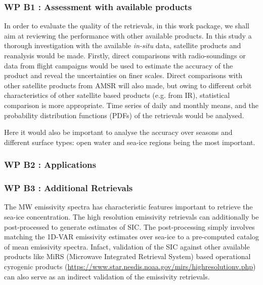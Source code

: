 \documentclass[12pt,oneside,a4paper]{article}
\begin{document}
\subsubsection*{WP B1 : Assessment with available products}

In order to evaluate the quality of the retrievals, in this work package, we shall aim at reviewing the performance with other available products. In this study a thorough investigation with the available \textit{in-situ} data, satellite products and reanalysis would be made. Firstly, direct comparisons with radio-soundings or data from flight campaigns would be used to estimate the accuracy of the product and reveal the uncertainties on finer scales.  Direct comparisons with other satellite products from AMSR \citep{gomez:2020:impro} will also made, but owing to different orbit characteristics of other satellite based products (e.g. from IR), statistical comparison is more appropriate. Time series of daily and monthly means, and the probability distribution functions (PDFs) of the retrievals would be analysed.

Here it would also be important to analyse the accuracy over seasons and different surface types: open water and sea-ice regions being the most important.

\subsubsection*{WP B2 : Applications}


\subsubsection*{WP B3 : Additional Retrievals}

The MW emissivity spectra has characteristic features important to retrieve the sea-ice concentration. The high resolution emissivity retrievals can additionally be post-processed to generate estimates of SIC. The post-processing simply involves matching the 1D-VAR emissivity estimates over sea-ice to a pre-computed catalog of mean emissivity spectra. Infact, validation of the SIC against other available products like MiRS (Microwave Integrated Retrieval System) based operational cyrogenic products (\url{https://www.star.nesdis.noaa.gov/mirs/highresolutionv.php}) can also serve as an indirect validation of the emissivity retrievals.

\end{document}
